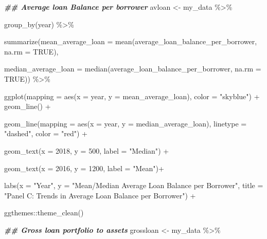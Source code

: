 \documentclass[a4paper,nobind]{templates/ociamthesis}
\newenvironment{Shaded}{\begin{snugshade}}{\end{snugshade}}
\newcommand{\AttributeTok}[1]{\textcolor[rgb]{0.77,0.63,0.00}{#1}}
\newcommand{\ConstantTok}[1]{\textcolor[rgb]{0.00,0.00,0.00}{#1}}
\newcommand{\DecValTok}[1]{\textcolor[rgb]{0.00,0.00,0.81}{#1}}
\newcommand{\DocumentationTok}[1]{\textcolor[rgb]{0.56,0.35,0.01}{\textbf{\textit{#1}}}}
\newcommand{\FunctionTok}[1]{\textcolor[rgb]{0.00,0.00,0.00}{#1}}
\newcommand{\NormalTok}[1]{#1}
\newcommand{\OtherTok}[1]{\textcolor[rgb]{0.56,0.35,0.01}{#1}}
\newcommand{\SpecialCharTok}[1]{\textcolor[rgb]{0.00,0.00,0.00}{#1}}
\newcommand{\StringTok}[1]{\textcolor[rgb]{0.31,0.60,0.02}{#1}}
\renewenvironment{Shaded}
{
  \vspace{10pt}%
  \begin{snugshade}%
}{%
  \end{snugshade}%
  \vspace{8pt}%
}
\begin{document}
\begin{Shaded}
\begin{Highlighting}[]
\DocumentationTok{\#\# Average loan Balance per borrower}
\NormalTok{avloan }\OtherTok{\textless{}{-}}\NormalTok{ my\_data }\SpecialCharTok{\%\textgreater{}\%} 
  
  \FunctionTok{group\_by}\NormalTok{(year) }\SpecialCharTok{\%\textgreater{}\%} 
  
  \FunctionTok{summarize}\NormalTok{(}\AttributeTok{mean\_average\_loan =} \FunctionTok{mean}\NormalTok{(average\_loan\_balance\_per\_borrower, }\AttributeTok{na.rm =} \ConstantTok{TRUE}\NormalTok{), }
                               
  \AttributeTok{median\_average\_loan =} \FunctionTok{median}\NormalTok{(average\_loan\_balance\_per\_borrower, }\AttributeTok{na.rm =} \ConstantTok{TRUE}\NormalTok{)) }\SpecialCharTok{\%\textgreater{}\%} 
  
  \FunctionTok{ggplot}\NormalTok{(}\AttributeTok{mapping =} \FunctionTok{aes}\NormalTok{(}\AttributeTok{x =}\NormalTok{ year, }\AttributeTok{y =}\NormalTok{ mean\_average\_loan), }\AttributeTok{color =} \StringTok{"skyblue"}\NormalTok{) }\SpecialCharTok{+} \FunctionTok{geom\_line}\NormalTok{() }\SpecialCharTok{+}
  
  \FunctionTok{geom\_line}\NormalTok{(}\AttributeTok{mapping =} \FunctionTok{aes}\NormalTok{(}\AttributeTok{x =}\NormalTok{ year, }\AttributeTok{y =}\NormalTok{ median\_average\_loan), }\AttributeTok{linetype =} \StringTok{"dashed"}\NormalTok{, }\AttributeTok{color =} \StringTok{"red"}\NormalTok{) }\SpecialCharTok{+}
  
  \FunctionTok{geom\_text}\NormalTok{(}\AttributeTok{x =} \DecValTok{2018}\NormalTok{, }\AttributeTok{y =} \DecValTok{500}\NormalTok{, }\AttributeTok{label =} \StringTok{"Median"}\NormalTok{) }\SpecialCharTok{+} 
  
  \FunctionTok{geom\_text}\NormalTok{(}\AttributeTok{x =} \DecValTok{2016}\NormalTok{, }\AttributeTok{y =} \DecValTok{1200}\NormalTok{, }\AttributeTok{label =} \StringTok{"Mean"}\NormalTok{)}\SpecialCharTok{+}
  
  \FunctionTok{labs}\NormalTok{(}\AttributeTok{x =} \StringTok{"Year"}\NormalTok{, }\AttributeTok{y =} \StringTok{"Mean/Median Average Loan Balance per Borrower"}\NormalTok{, }\AttributeTok{title =} \StringTok{"Panel C: Trends in Average Loan Balance per Borrower"}\NormalTok{) }\SpecialCharTok{+} 
  
\NormalTok{  ggthemes}\SpecialCharTok{::}\FunctionTok{theme\_clean}\NormalTok{()}


\DocumentationTok{\#\# Gross loan portfolio to assets }
\NormalTok{grossloan }\OtherTok{\textless{}{-}}\NormalTok{ my\_data }\SpecialCharTok{\%\textgreater{}\%} 
  

\end{Highlighting}
\end{Shaded}
\end{document}
